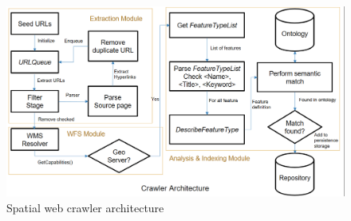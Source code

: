\begin{figure}[h]
  \includegraphics[width=\textwidth]{2}
  \caption{Spatial web crawler architecture}
\end{figure}


